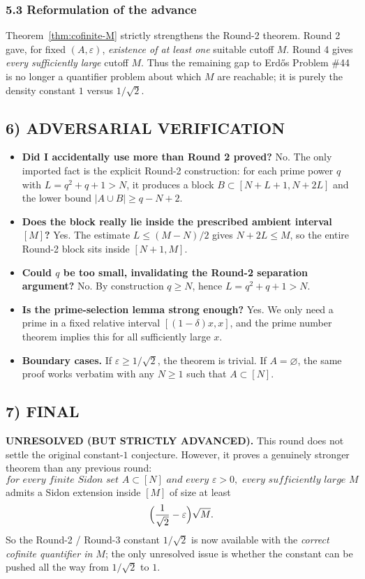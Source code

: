 \subsubsection*{5.3\; Reformulation of the advance}
Theorem~\ref{thm:cofinite-M} strictly strengthens the Round-2 theorem.
Round 2 gave, for fixed $(A,\varepsilon)$, \emph{existence of at least one} suitable cutoff $M$.
Round 4 gives \emph{every sufficiently large} cutoff $M$.
Thus the remaining gap to Erd\H{o}s Problem \#44 is no longer a quantifier problem about which $M$ are reachable; it is purely the density constant $1$ versus $1/\sqrt2$.

\subsection*{6) ADVERSARIAL VERIFICATION}
\begin{itemize}
\item \textbf{Did I accidentally use more than Round 2 proved?}
No.  The only imported fact is the explicit Round-2 construction: for each prime power $q$ with $L=q^2+q+1>N$, it produces a block $B\subset [N+L+1,N+2L]$ and the lower bound $|A\cup B|\ge q-N+2$.

\item \textbf{Does the block really lie inside the prescribed ambient interval $[M]$?}
Yes.  The estimate $L\le (M-N)/2$ gives $N+2L\le M$, so the entire Round-2 block sits inside $[N+1,M]$.

\item \textbf{Could $q$ be too small, invalidating the Round-2 separation argument?}
No.  By construction $q\ge N$, hence $L=q^2+q+1>N$.

\item \textbf{Is the prime-selection lemma strong enough?}
Yes.  We only need a prime in a fixed relative interval $[(1-\delta)x,x]$, and the prime number theorem implies this for all sufficiently large $x$.

\item \textbf{Boundary cases.}
If $\varepsilon\ge 1/\sqrt2$, the theorem is trivial.  If $A=\varnothing$, the same proof works verbatim with any $N\ge 1$ such that $A\subset [N]$.
\end{itemize}

\subsection*{7) FINAL}
\textbf{UNRESOLVED (BUT STRICTLY ADVANCED).}
This round does not settle the original constant-$1$ conjecture.  However, it proves a genuinely stronger theorem than any previous round:
\[
\textit{for every finite Sidon set }A\subset [N]\textit{ and every }\varepsilon>0,\textit{ every sufficiently large }M
\]
admits a Sidon extension inside $[M]$ of size at least
\[
\Bigl(\frac1{\sqrt2}-\varepsilon\Bigr)\sqrt M.
\]
So the Round-2 / Round-3 constant $1/\sqrt2$ is now available with the \emph{correct cofinite quantifier in $M$}; the only unresolved issue is whether the constant can be pushed all the way from $1/\sqrt2$ to $1$.

